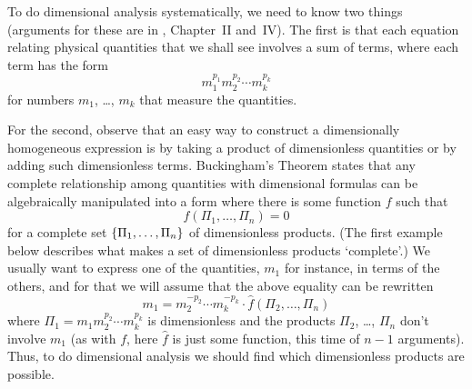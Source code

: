To do dimensional analysis systematically, we need to know two things
(arguments for these are in \cite{Bridgman}, Chapter~II and~IV).
The first is that each equation relating physical 
quantities that we shall see involves a sum of terms, 
where each term has the form
\begin{equation*}
  m_1^{p_1}m_2^{p_2}\cdots m_k^{p_k}
\end{equation*}
for numbers $m_1$, \ldots, $m_k$ that measure the quantities.

For the second, observe that an easy way to construct a dimensionally
homogeneous expression is by taking a product of dimensionless quantities
or by adding such dimensionless terms.
Buckingham's Theorem states that any
complete relationship among quantities with 
dimensional formulas can be algebraically manipulated into a form where
there is some function $f$ such that
\begin{equation*}
  f(\Pi_1,\ldots,\Pi_n)=0
\end{equation*}
for a complete set $\mbox{$\{\Pi_1,\ldots,\Pi_n\}$}$ of dimensionless products.
(The first example below describes what makes a set of dimensionless 
products `complete'.)
We usually want to express one of the quantities, $m_1$ for instance,
in terms of the others, 
and for that we will assume that the above equality can be rewritten 
\begin{equation*}
  m_1=m_2^{-p_2}\cdots m_k^{-p_k}\cdot \hat{f}(\Pi_2,\ldots,\Pi_n)
\end{equation*}
where $\Pi_1=m_1m_2^{p_2}\cdots m_k^{p_k}$ is dimensionless
and the products $\Pi_2$, \ldots, $\Pi_n$ don't involve $m_1$
(as with $f$, here $\hat{f}$ is just some function, this time 
of $n-1$ arguments).
Thus, to do dimensional analysis we should
find which dimensionless products are possible.

